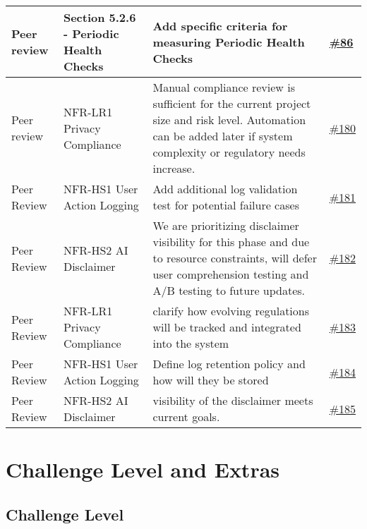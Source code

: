 \documentclass{article}
\begin{document}
\begin{longtable}{| p{} | p{} | p{} | p{} |}
    \hline
    Peer review & Section 5.2.6 - Periodic Health Checks & Add specific criteria for measuring Periodic Health Checks &  \href{https://github.com/RezaJodeiri/CXR-Capstone/issues/86}{\#86}\\
    \hline
    Peer review & NFR-LR1 Privacy Compliance & Manual compliance review is sufficient for the current project size and risk level. Automation can be added later if system complexity or regulatory needs increase. & \href{https://github.com/RezaJodeiri/CXR-Capstone/issues/180}{\#180}\\
    \hline
    Peer Review & NFR-HS1 User Action Logging & Add additional log validation test for potential failure cases & \href{https://github.com/RezaJodeiri/CXR-Capstone/issues/181}{\#181}\\
    \hline
    Peer Review & NFR-HS2 AI Disclaimer & We are prioritizing disclaimer visibility for this phase and due to resource constraints, will defer user comprehension testing and A/B testing to future updates. & \href{https://github.com/RezaJodeiri/CXR-Capstone/issues/182}{\#182}\\
    \hline 
    Peer Review & NFR-LR1 Privacy Compliance & clarify how evolving regulations will be tracked and integrated into the system & \href{https://github.com/RezaJodeiri/CXR-Capstone/issues/183}{\#183}\\
    \hline
    Peer Review & NFR-HS1 User Action Logging & Define log retention policy and how will they be stored & \href{https://github.com/RezaJodeiri/CXR-Capstone/issues/184}{\#184}\\
    \hline 
    Peer Review & NFR-HS2 AI Disclaimer & visibility of the disclaimer meets current goals. & \href{https://github.com/RezaJodeiri/CXR-Capstone/issues/185}{\#185}\\
    \hline
\end{longtable}

\section{Challenge Level and Extras}

\subsection{Challenge Level}
\end{document}
